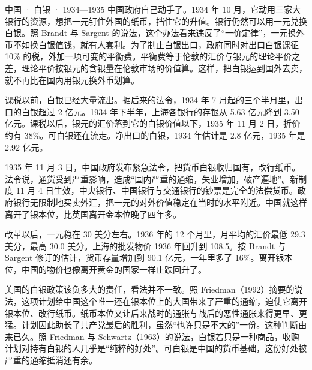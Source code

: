 \begin{case}{中国 · 白银 · 1934—1935}
中国政府自己动手了。1934 年 10 月，它动用三家大银行的资源，想把一元钉住外国的纸币，挡住它的升值\cite{brandt1989}。银行仍然可以用一元兑换白银\cite{brandt1989}。照 Brandt 与 Sargent 的说法，这个办法看来违反了“一价定律”，一元换外币不如换白银值钱，就有人套利\cite{brandt1989}。为了制止白银出口，政府同时对出口白银课征 10\% 的税，外加一项可变的平衡费\cite{frb1935}。平衡费等于伦敦的汇价与银元的理论平价之差，理论平价按银元的含银量在伦敦市场的价值算\cite{frb1935}。这样，把白银运到国外去卖，就不再比在国内用银元换外币划算。

课税以前，白银已经大量流出。据后来的法令，1934 年 7 月起的三个半月里，出口的白银超过 2 亿元\cite{brandt1989}。1934 年下半年，上海各银行的存银从 5.63 亿元降到 3.50 亿元\cite{brandt1989}。课税以后，银元的汇价落到它的白银价值以下，1935 年 11 月 2 日，折价约有 38\%\cite{frb1935}。可白银还在流走。净出口的白银，1934 年估计是 2.8 亿元，1935 年是 2.92 亿元\cite{brandt1989}。

1935 年 11 月 3 日，中国政府发布紧急法令，把货币白银收归国有，改行纸币\cite{brandt1989}。法令说，通货受到严重影响，造成“国内严重的通缩，失业增加，破产遍地”\cite{brandt1989}。新制度 11 月 4 日生效，中央银行、中国银行与交通银行的钞票是完全的法偿货币\cite{frb1935}。政府银行无限制地买卖外汇，把一元的对外价值稳定在当时的水平附近\cite{frb1935}。中国就这样离开了银本位，比英国离开金本位晚了四年多。

改革以后，一元稳在 30 美分左右。1936 年的 12 个月里，月平均的汇价最低 29.3 美分，最高 30.0 美分\cite{bms1943}。上海的批发物价 1936 年回升到 108.5\cite{brandt1989}。按 Brandt 与 Sargent 修订的估计，货币存量增加到 90.1 亿元，一年里多了 16\%\cite{brandt1989}。离开银本位，中国的物价也像离开黄金的国家一样止跌回升了。
\end{case}

美国的白银政策该负多大的责任，看法并不一致。照 Friedman（1992）摘要的说法，这项计划给中国这个唯一还在银本位上的大国带来了严重的通缩，迫使它离开银本位、改行纸币\cite{friedman1992}。纸币本位又让后来战时的通胀与战后的恶性通胀来得更早、更猛\cite{friedman1992}。计划因此助长了共产党最后的胜利，虽然“也许只是不大的”一份\cite{friedman1992}。这种判断由来已久。照 Friedman 与 Schwartz（1963）的说法，白银若只是一种商品，收购计划对持有白银的人几乎是“纯粹的好处”\cite{brandt1989}。可白银是中国的货币基础，这份好处被严重的通缩抵消还有余\cite{brandt1989}。


